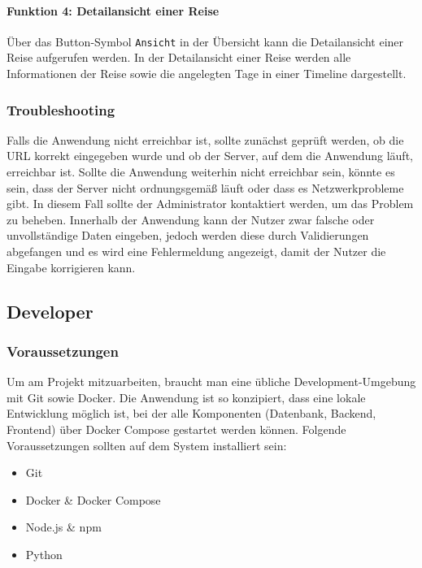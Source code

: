 \documentclass[12pt,a4paper]{article}
\begin{document}
        \paragraph{Funktion 4: Detailansicht einer Reise}
            Über das Button-Symbol \texttt{Ansicht} in der Übersicht kann die Detailansicht einer Reise aufgerufen werden.
            In der Detailansicht einer Reise werden alle Informationen der Reise sowie die angelegten Tage in einer Timeline dargestellt.

        \subsubsection{Troubleshooting}
            Falls die Anwendung nicht erreichbar ist, sollte zunächst geprüft werden, ob die URL korrekt eingegeben wurde und ob der Server, auf dem die Anwendung läuft, erreichbar ist.
            Sollte die Anwendung weiterhin nicht erreichbar sein, könnte es sein, dass der Server nicht ordnungsgemäß läuft oder dass es Netzwerkprobleme gibt.
            In diesem Fall sollte der Administrator kontaktiert werden, um das Problem zu beheben.
            Innerhalb der Anwendung kann der Nutzer zwar falsche oder unvollständige Daten eingeben, jedoch werden diese durch Validierungen abgefangen und es wird eine Fehlermeldung angezeigt, damit der Nutzer die Eingabe korrigieren kann.


    \newpage
    \subsection{Developer}
    \subsubsection{Voraussetzungen}
        Um am Projekt mitzuarbeiten, braucht man eine übliche Development-Umgebung mit Git sowie Docker.
        Die Anwendung ist so konzipiert, dass eine lokale Entwicklung möglich ist, bei der alle Komponenten
        (Datenbank, Backend, Frontend) über Docker Compose gestartet werden können.
        Folgende Voraussetzungen sollten auf dem System installiert sein:
        \begin{itemize}[leftmargin=*]
            \item Git
            \item Docker \& Docker Compose
            \item Node.js \& npm
            \item Python
        \end{itemize}
\end{document}
